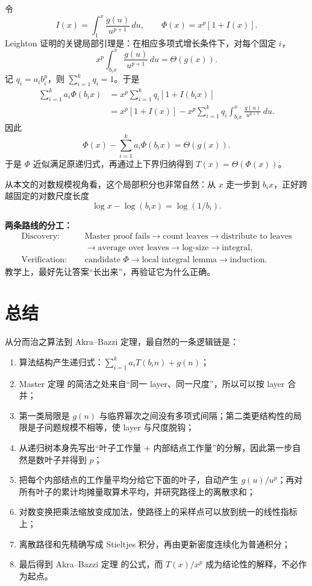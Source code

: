 \documentclass[11pt,a4paper]{article}
\newcommand{\AB}{Akra--Bazzi 定理}
\newcommand{\Master}{Master 定理}
\begin{document}
令
\[
I(x)=\int_1^x\frac{g(u)}{u^{p+1}}\,du,
\qquad
\Phi(x)=x^p[1+I(x)].
\]
Leighton 证明的关键局部引理是：在相应多项式增长条件下，对每个固定 $i$，
\begin{equation}
x^p\int_{b_i x}^{x}\frac{g(u)}{u^{p+1}}\,du
=\Theta(g(x)).
\end{equation}
记 $q_i=a_i b_i^p$，则 $\sum_{i=1}^k q_i=1$。于是
\begin{align}
\sum_{i=1}^k a_i\Phi(b_i x)
&=x^p\sum_{i=1}^k q_i[1+I(b_i x)]\\
&=x^p[1+I(x)]
-x^p\sum_{i=1}^k q_i\int_{b_i x}^{x}\frac{g(u)}{u^{p+1}}\,du.
\end{align}
因此
\begin{equation}
\Phi(x)-\sum_{i=1}^k a_i\Phi(b_i x)=\Theta(g(x)).
\end{equation}
于是 $\Phi$ 近似满足原递归式，再通过上下界归纳得到 $T(x)=\Theta(\Phi(x))$。

从本文的对数规模视角看，这个局部积分也非常自然：从 $x$ 走一步到 $b_i x$，正好跨越固定的对数尺度长度
\[
\log x-\log(b_i x)=\log(1/b_i).
\]

\begin{tcolorbox}
\textbf{两条路线的分工：}
\begin{align*}
\text{Discovery: }&\quad
\text{Master proof fails}\to\text{count leaves}\to\text{distribute to leaves}\\
&\quad\to\text{average over leaves}\to\text{log-size}\to\text{integral},\\
\text{Verification: }&\quad
\text{candidate }\Phi\to\text{local integral lemma}\to\text{induction}.
\end{align*}
教学上，最好先让答案“长出来”，再验证它为什么正确。
\end{tcolorbox}

\fi

\section{总结}
从分而治之算法到 \AB{}，最自然的一条逻辑链是：
\begin{enumerate}[label=\arabic*.]
\item 算法结构产生递归式：$\sum_{i=1}^k a_iT(b_i n)+g(n)$；
\item \Master{} 的简洁之处来自“同一 layer、同一尺度”，所以可以按 layer 合并；
\item 第一类局限是 $g(n)$ 与临界幂次之间没有多项式间隔；第二类更结构性的局限是子问题规模不相等，使 layer 与尺度脱钩；
\item 从递归树本身先写出“叶子工作量 + 内部结点工作量”的分解，因此第一步自然是数叶子并得到 $p$；
\item 把每个内部结点的工作量平均分给它下面的叶子，自动产生 $g(u)/u^p$；再对所有叶子的累计均摊量取算术平均，并研究路径上的离散求和；
\item 对数变换把乘法缩放变成加法，使路径上的采样点可以放到统一的线性指标上；
\item 离散路径和先精确写成 Stieltjes 积分，再由更新密度连续化为普通积分；
\item 最后得到 \AB{} 的公式，而 $T(x)/x^p$ 成为结论性的解释，不必作为起点。
\end{enumerate}
\end{document}
